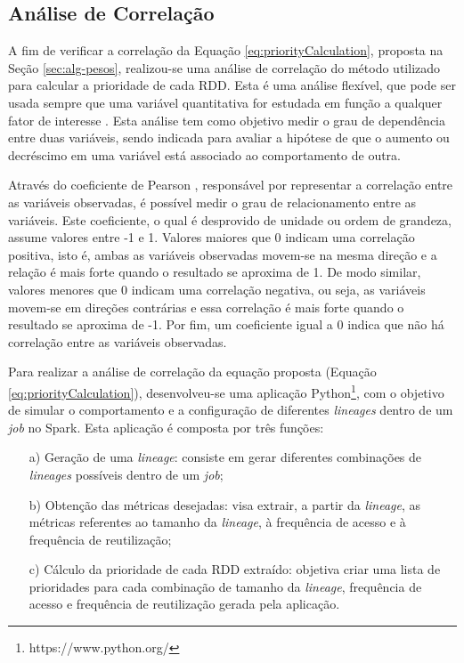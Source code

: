 \subsection{Análise de Correlação} \label{subsec:analise-convergencia}
A fim de verificar a correlação da Equação \ref{eq:priorityCalculation}, proposta na Seção \ref{sec:alg-pesos}, realizou-se uma análise de correlação do método utilizado para calcular a prioridade de cada RDD. Esta é uma análise flexível, que pode ser usada sempre que uma variável quantitativa for estudada em função a qualquer fator de interesse \cite{cohen2014applied}. Esta análise tem como objetivo medir o grau de dependência entre duas variáveis, sendo indicada para avaliar a hipótese de que o aumento ou decréscimo em uma variável está associado ao comportamento de outra.

Através do coeficiente de Pearson \cite{benesty2009pearson}, responsável por representar a correlação entre as variáveis observadas, é possível medir o grau de relacionamento entre as variáveis. Este coeficiente, o qual é desprovido de unidade ou ordem de grandeza, assume valores entre -1 e 1. Valores maiores que 0 indicam uma correlação positiva, isto é, ambas as variáveis observadas movem-se na mesma direção e a relação é mais forte quando o resultado se aproxima de 1. De modo similar, valores menores que 0 indicam uma correlação negativa, ou seja, as variáveis movem-se em direções contrárias e essa correlação é mais forte quando o resultado se aproxima de -1. Por fim, um coeficiente igual a 0 indica que não há correlação entre as variáveis observadas.


Para realizar a análise de correlação da equação proposta (Equação \ref{eq:priorityCalculation}), desenvolveu-se uma aplicação Python\footnote{https://www.python.org/}, com o objetivo de simular o comportamento e a configuração de diferentes \textit{lineages} dentro de um \textit{job} no Spark. Esta aplicação é composta por três funções:

\begin{enumerate}
	\item[a)] Geração de uma \textit{lineage}: consiste em gerar diferentes combinações de \textit{lineages} possíveis dentro de um \textit{job};
	\item[b)] Obtenção das métricas desejadas: visa extrair, a partir da \textit{lineage}, as métricas referentes ao tamanho da \textit{lineage}, à frequência de acesso e à frequência de reutilização;
	\item[c)] Cálculo da prioridade de cada RDD extraído: objetiva criar uma lista de prioridades para cada combinação de tamanho da \textit{lineage}, frequência de acesso e frequência de reutilização gerada pela aplicação.
\end{enumerate}

